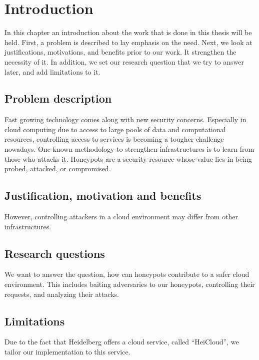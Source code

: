 \chapter{Introduction}

In this chapter an introduction about the work that is done in this thesis will be held. First, a problem is described to lay emphasis on the need. Next, we look at justifications, motivations, and benefits prior to our work. It strengthen the necessity of it. In addition, we set our research question that we try to answer later, and add limitations to it.

\section{Problem description}




Fast growing technology comes along with new security concerns. Especially in cloud computing due to access to large pools of data and computational resources, controlling access to services is becoming a tougher challenge nowadays. One known methodology to strengthen infrastructures is to learn from those who attacks it. Honeypots are a security resource whose value lies in being probed, attacked, or compromised.

\section{Justification, motivation and benefits}

However, controlling attackers in a cloud environment may differ from
other infrastructures.

\section{Research questions}

We want to answer the question, how can honeypots contribute to a safer cloud environment. This includes baiting adversaries to our honeypots, controlling their requests, and analyzing their attacks.

\section{Limitations}

Due to the fact that Heidelberg offers a cloud service, called
\enquote{HeiCloud}, we tailor our implementation to this service.